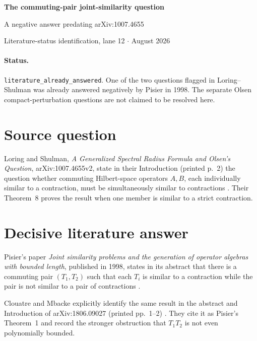 \documentclass[10pt]{article}
\begin{document}
\begin{center}
{\LARGE\bfseries The commuting-pair joint-similarity question}\par
\vspace{0.25em}
{\large A negative answer predating arXiv:1007.4655}\par
\vspace{0.65em}
Literature-status identification, lane 12 \quad $\cdot$  August 2026
\end{center}
\vspace{0.4em}

\paragraph{Status.}
\texttt{literature\_already\_answered}.  One of the two questions flagged in
Loring--Shulman was already answered negatively by Pisier in 1998.  The
separate Olsen compact-perturbation questions are not claimed to be resolved
here.

\section*{Source question}

Loring and Shulman, \emph{A Generalized Spectral Radius Formula and Olsen's
Question}, arXiv:1007.4655v2, state in their Introduction (printed p.~2) the
question whether commuting Hilbert-space operators $A,B$, each individually
similar to a contraction, must be simultaneously similar to contractions
\cite{LS}.  Their Theorem~8 proves the result when one member is similar to a
strict contraction.

\section*{Decisive literature answer}

Pisier's paper \emph{Joint similarity problems and the generation of operator
algebras with bounded length}, published in 1998, states in its abstract that
there is a commuting pair $(T_1,T_2)$ such that each $T_i$ is similar to a
contraction while the pair is not similar to a pair of contractions
\cite{Pisier}.

Clouatre and Mbacke explicitly identify the same result in the abstract and
Introduction of arXiv:1806.09027 (printed pp.~1--2) \cite{CM}.  They cite it as
Pisier's Theorem~1 and record the stronger obstruction that $T_1T_2$ is not
even polynomially bounded.
\end{document}
